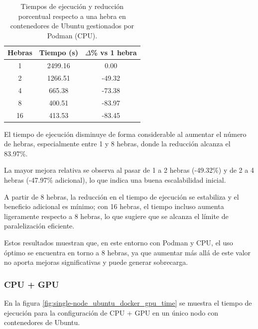 \begin{table}[ht]
    \centering
    \begin{tabular}{|c|c|c|}
        \hline
        \textbf{Hebras} & \textbf{Tiempo (s)} & \textbf{$\Delta$\% vs 1 hebra} \\
        \hline
        1               & 2499.16             & 0.00                           \\
        2               & 1266.51             & -49.32                         \\
        4               & 665.38              & -73.38                         \\
        8               & 400.51              & -83.97                         \\
        16              & 413.53              & -83.45                         \\
        \hline
    \end{tabular}
    \caption{Tiempos de ejecución y reducción porcentual respecto a una hebra en contenedores de Ubuntu gestionados por Podman (CPU).}
    \label{tab:single-node_ubuntu_podman}
\end{table}

El tiempo de ejecución disminuye de forma considerable al aumentar el número de hebras, especialmente entre 1 y 8 hebras, donde la reducción alcanza el 83.97\%.

La mayor mejora relativa se observa al pasar de 1 a 2 hebras (-49.32\%) y de 2 a 4 hebras (-47.97\% adicional), lo que indica una buena escalabilidad inicial.

A partir de 8 hebras, la reducción en el tiempo de ejecución se estabiliza y el beneficio adicional es mínimo; con 16 hebras, el tiempo incluso aumenta ligeramente respecto a 8 hebras, lo que sugiere que se alcanza el límite de paralelización eficiente.

Estos resultados muestran que, en este entorno con Podman y CPU, el uso óptimo se encuentra en torno a 8 hebras, ya que aumentar más allá de este valor no aporta mejoras significativas y puede generar sobrecarga.

\subsubsection{CPU + GPU}

En la figura \ref{fig:single-node_ubuntu_docker_gpu_time} se muestra el tiempo de ejecución para la configuración de CPU + GPU en un único nodo con contenedores de Ubuntu.


